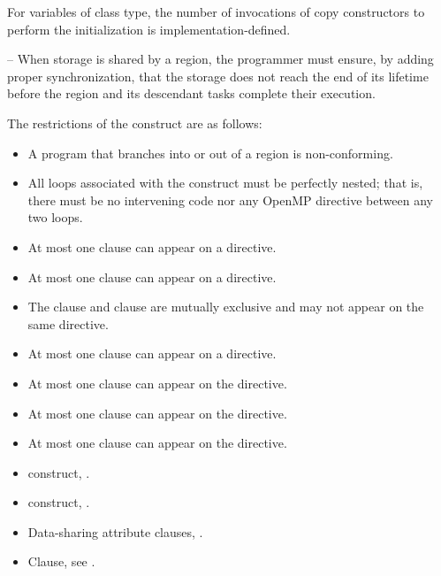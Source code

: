\cppspecificstart
For  variables of class type, the number of invocations of copy constructors to perform the initialization  is implementation-defined.
\cppspecificend

\notestart
\noteheader – When storage is shared by a  region, the programmer must ensure, by adding proper synchronization, that the storage does not reach the end of its lifetime before the  region and its descendant tasks complete their execution.
\noteend

\restrictions
The restrictions of the  construct are as follows:
\begin{itemize}
\item A program that branches into or out of a  region is non-conforming.
\item All loops associated with the  construct must be perfectly nested; that is, there must be no intervening code nor any OpenMP directive between any two loops.
\item At most one  clause can appear on a  directive.
\item At most one  clause can appear on a  directive.
\item The  clause and  clause are mutually exclusive and may not appear on the same  directive.
\item At most one  clause can appear on a  directive.
\item At most one  clause can appear on the directive.
\item At most one  clause can appear on the directive. 
\item At most one  clause can appear on the directive.
\end{itemize}

\crossreferences
\begin{itemize}
\item {} construct, .
\item {} construct, .
\item Data-sharing attribute clauses, . 
\item {} Clause, see .
\end{itemize}






